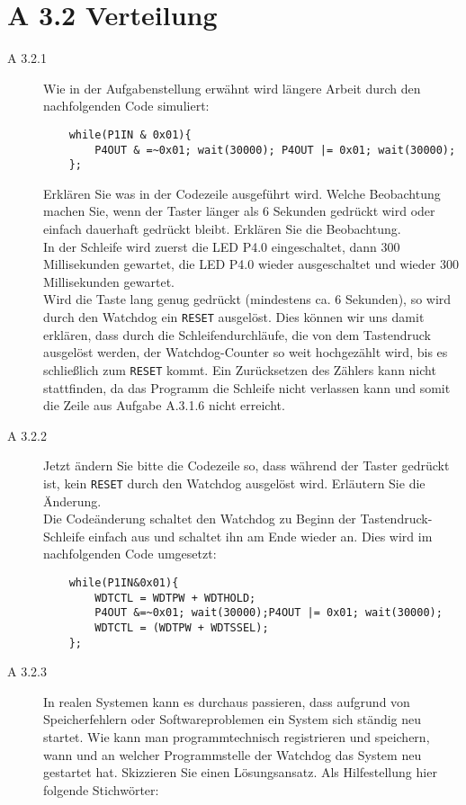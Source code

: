 \documentclass[11pt,a4paper,ngerman]{article}
\begin{document}
\newpage
\section*{A 3.2 Verteilung}
\begin{description}
	\item[A 3.2.1] Wie in der Aufgabenstellung erwähnt wird längere Arbeit durch den nachfolgenden Code simuliert:
		\begin{lstlisting}
	while(P1IN & 0x01){
		P4OUT & =~0x01; wait(30000); P4OUT |= 0x01; wait(30000);
	};
        \end{lstlisting}
Erklären Sie was in der Codezeile ausgeführt wird. Welche Beobachtung machen Sie, wenn der Taster länger als 6 Sekunden gedrückt wird oder einfach dauerhaft gedrückt bleibt. Erklären Sie die Beobachtung. \\

	In der Schleife wird zuerst die LED P4.0 eingeschaltet, dann 300 Millisekunden gewartet, die LED P4.0 wieder ausgeschaltet und wieder 300 Millisekunden gewartet.\\
	Wird die Taste lang genug gedrückt (mindestens ca. 6 Sekunden), so wird durch den Watchdog ein \texttt{RESET} ausgelöst. Dies können wir uns damit erklären, dass durch die Schleifendurchläufe, die von dem Tastendruck ausgelöst werden, der Watchdog-Counter so weit hochgezählt wird, bis es schließlich zum \texttt{RESET} kommt. Ein Zurücksetzen des Zählers kann nicht stattfinden, da das Programm die Schleife nicht verlassen kann und somit die Zeile aus Aufgabe A.3.1.6 nicht erreicht.

	\item[A 3.2.2] Jetzt ändern Sie bitte die Codezeile so, dass während der Taster gedrückt ist, kein \texttt{RESET} durch den Watchdog ausgelöst wird. Erläutern Sie die Änderung. \\
	
	Die Codeänderung schaltet den Watchdog zu Beginn der Tastendruck-Schleife einfach aus und schaltet ihn am Ende wieder an. Dies wird im nachfolgenden Code umgesetzt:
	\begin{lstlisting}
	while(P1IN&0x01){
		WDTCTL = WDTPW + WDTHOLD;
		P4OUT &=~0x01; wait(30000);P4OUT |= 0x01; wait(30000);
		WDTCTL = (WDTPW + WDTSSEL);
	};
	\end{lstlisting}
	
	\item[A 3.2.3] In realen Systemen kann es durchaus passieren, dass aufgrund von Speicherfehlern oder Softwareproblemen ein System sich ständig neu startet. Wie kann man programmtechnisch registrieren und speichern, wann und an welcher Programmstelle der Watchdog das System neu gestartet hat. Skizzieren Sie einen Lösungsansatz. Als Hilfestellung hier folgende Stichwörter: \\


\end{description}
\end{document}

